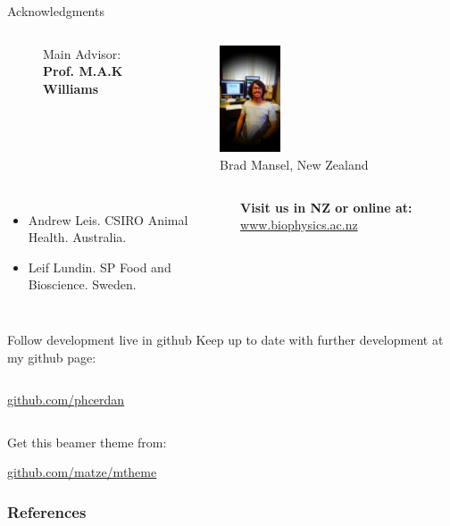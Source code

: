 \documentclass[10pt]{beamer}
\begin{document}
\begin{frame}{Acknowledgments}
\begin{columns}[onlytextwidth]
\begin{figure}[htpb]
  \caption*{Main Advisor: \textbf{Prof. M.A.K Williams}}
\end{figure}
    \begin{figure}[htpb]
      \centering
      \includegraphics[width=0.3\textwidth]{./Figures/people/brad.png}
      \caption*{Brad Mansel, New Zealand}
    \end{figure}
  \end{columns}
  \begin{columns}[onlytextwidth]
    \begin{itemize}
      \item Andrew Leis. CSIRO Animal Health. Australia.
      \item Leif Lundin. SP Food and Bioscience. Sweden.
    \end{itemize}
    \textbf{Visit us in NZ or online at:}\newline
        \url{www.biophysics.ac.nz}
  \end{columns}
\end{frame}
\begin{frame}{Follow development live in github}
  Keep up to date with further development at my github page:
  \vspace{2mm}
  \begin{columns}[onlytextwidth]
      \begin{center}\url{github.com/phcerdan}\end{center}
  \end{columns}


  \vspace{2mm}
  Get this beamer theme from:

  \begin{center}\url{github.com/matze/mtheme}\end{center}

  \begin{center}\ccbysa\end{center}

\end{frame}
\begin{frame}[allowframebreaks]

  \frametitle{References}

  
  

\end{frame}
\end{document}

